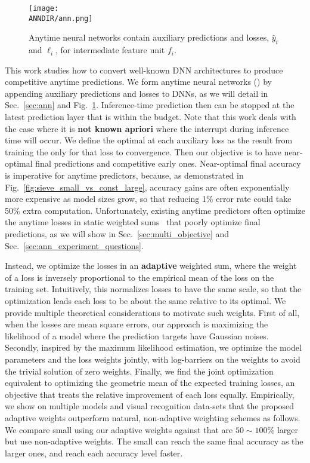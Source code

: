 \begin{figure}
    \centering
    \texttt{[image: \\ANNDIR/ann.png]}
    \caption{Anytime neural networks contain auxiliary predictions and losses, $\hat{y}_i$ and $\ell_i$, for intermediate feature unit $f_i$.  }
    \label{fig:ann}
\end{figure}

This work studies how to convert well-known DNN architectures to produce competitive anytime predictions.  
We form anytime neural networks (\anns) by appending auxiliary predictions and losses to DNNs, as we will detail in Sec.~\ref{sec:ann} and Fig.~\ref{fig:ann}. Inference-time prediction then can be stopped at the latest prediction layer that is within the budget. Note that this work deals with the case where it is \textbf{not known apriori} where the interrupt during inference time will occur. 
We define the optimal at each auxiliary loss as the result from training the \ann only for that loss to convergence. Then our objective is to have near-optimal final predictions and competitive early ones.  Near-optimal final accuracy is imperative for anytime predictors, because, as demonstrated in Fig.~\ref{fig:sieve_small_vs_const_large}, accuracy gains are often exponentially more expensive as model sizes grow, so that reducing 1\% error rate could take 50\% extra computation. Unfortunately, existing anytime predictors often optimize the anytime losses in static weighted sums~\cite{supervisednet,feedbacknet,msdense} that poorly optimize final predictions, as we will show in Sec.~\ref{sec:multi_objective} and Sec.~\ref{sec:ann_experiment_questions}.

Instead, we optimize the losses in an \textbf{adaptive} weighted sum, where the weight of a loss is inversely proportional to the empirical mean of the loss on the training set. Intuitively, this normalizes losses to have the same scale, so that the optimization leads each loss to be about the same relative to its optimal. We provide multiple theoretical considerations to motivate such weights.
First of all, when the losses are mean square errors, our approach is maximizing the likelihood of a model where the prediction targets have Gaussian noises. Secondly, inspired by the maximum likelihood estimation, we optimize the model parameters and the loss weights jointly, with log-barriers on the weights to avoid the trivial solution of zero weights. Finally, we find the joint optimization equivalent to optimizing the geometric mean of the expected training losses, an objective that treats the relative improvement of each loss equally. Empirically, we show on multiple models and visual recognition data-sets that the proposed adaptive weights outperform natural, non-adaptive weighting schemes as follows.
We compare small \anns using our adaptive weights against \anns that are $50\sim 100\%$ larger but use non-adaptive weights. The small \anns can reach the same final accuracy as the larger ones, and reach each accuracy level faster.


